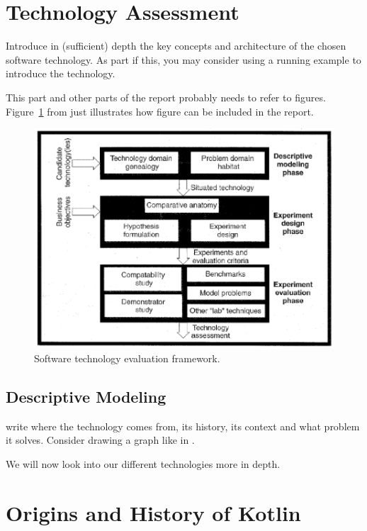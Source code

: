 \section{Technology Assessment}
\label{sec:technology}



Introduce in (sufficient) depth the key concepts and architecture of the chosen software technology. As part if this, you may consider using a running example to introduce the technology.

This part and other parts of the report probably needs to refer to
figures. Figure~\ref{fig:framework} from \cite{brown:96} just
illustrates how figure can be included in the report.

\begin{figure}[thb]
	\centering
	\includegraphics[scale=0.5]{figs/framework.png}
	\caption{Software technology evaluation framework.}
	\label{fig:framework}
\end{figure}

\subsection{Descriptive Modeling}

write where the technology comes from, its history, its context and what problem it solves.
Consider drawing a graph like in \cite{brown:96}.

We will now look into our different technologies more in depth.

\section{Origins and History of Kotlin} 

